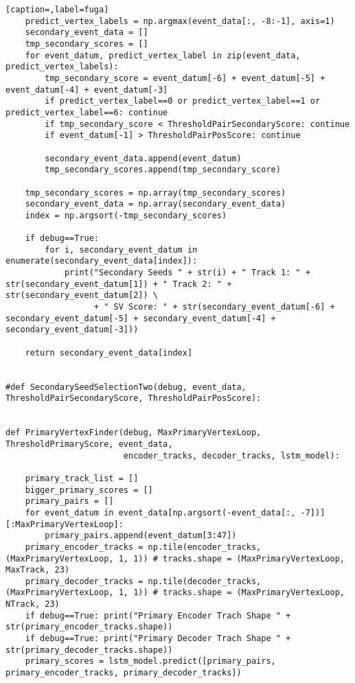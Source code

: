 \begin{lstlisting}[caption=,label=fuga]
    predict_vertex_labels = np.argmax(event_data[:, -8:-1], axis=1)
    secondary_event_data = []
    tmp_secondary_scores = []
    for event_datum, predict_vertex_label in zip(event_data, predict_vertex_labels):
        tmp_secondary_score = event_datum[-6] + event_datum[-5] + event_datum[-4] + event_datum[-3]
        if predict_vertex_label==0 or predict_vertex_label==1 or  predict_vertex_label==6: continue
        if tmp_secondary_score < ThresholdPairSecondaryScore: continue
        if event_datum[-1] > ThresholdPairPosScore: continue
	
        secondary_event_data.append(event_datum)
        tmp_secondary_scores.append(tmp_secondary_score)
        
    tmp_secondary_scores = np.array(tmp_secondary_scores)
    secondary_event_data = np.array(secondary_event_data)
    index = np.argsort(-tmp_secondary_scores)

    if debug==True: 
        for i, secondary_event_datum in enumerate(secondary_event_data[index]):
            print("Secondary Seeds " + str(i) + " Track 1: " + str(secondary_event_datum[1]) + " Track 2: " + str(secondary_event_datum[2]) \
                  + " SV Score: " + str(secondary_event_datum[-6] + secondary_event_datum[-5] + secondary_event_datum[-4] + secondary_event_datum[-3]))
    
    return secondary_event_data[index]


#def SecondarySeedSelectionTwo(debug, event_data, ThresholdPairSecondaryScore, ThresholdPairPosScore):


def PrimaryVertexFinder(debug, MaxPrimaryVertexLoop, ThresholdPrimaryScore, event_data, 
                        encoder_tracks, decoder_tracks, lstm_model):

    primary_track_list = []
    bigger_primary_scores = []
    primary_pairs = []
    for event_datum in event_data[np.argsort(-event_data[:, -7])][:MaxPrimaryVertexLoop]:
        primary_pairs.append(event_datum[3:47])
    primary_encoder_tracks = np.tile(encoder_tracks, (MaxPrimaryVertexLoop, 1, 1)) # tracks.shape = (MaxPrimaryVertexLoop, MaxTrack, 23)
    primary_decoder_tracks = np.tile(decoder_tracks, (MaxPrimaryVertexLoop, 1, 1)) # tracks.shape = (MaxPrimaryVertexLoop, NTrack, 23)
    if debug==True: print("Primary Encoder Trach Shape " + str(primary_encoder_tracks.shape))
    if debug==True: print("Primary Decoder Trach Shape " + str(primary_decoder_tracks.shape))
    primary_scores = lstm_model.predict([primary_pairs, primary_encoder_tracks, primary_decoder_tracks])


\end{lstlisting}
